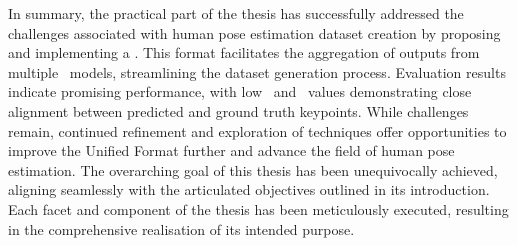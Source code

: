 In summary, the practical part of the thesis has successfully addressed the challenges associated with human pose estimation dataset creation by proposing and implementing a . This format facilitates the aggregation of outputs from multiple \NN\ models, streamlining the dataset generation process. Evaluation results indicate promising performance, with low \APE\ and \MSE\ values demonstrating close alignment between predicted and ground truth keypoints. While challenges remain, continued refinement and exploration of techniques offer opportunities to improve the Unified Format further and advance the field of human pose estimation. The overarching goal of this thesis has been unequivocally achieved, aligning seamlessly with the articulated objectives outlined in its introduction. Each facet and component of the thesis has been meticulously executed, resulting in the comprehensive realisation of its intended purpose.